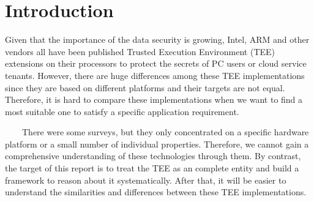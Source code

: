 \documentclass[12pt,twoside]{report}
\date{May 2022}
\begin{document}



\clearpage{\pagestyle{empty}\cleardoublepage}
\setcounter{page}{1}
\pagestyle{fancy}


\cleardoublepage


\tableofcontents 


\clearpage{\pagestyle{empty}\cleardoublepage}
\setcounter{page}{1}
\fancyhead[LE,RO]{\slshape \rightmark}
\fancyhead[LO,RE]{\slshape \leftmark}

\chapter{Introduction}



Given that the importance of the data security is growing, Intel, ARM and other vendors all have been published Trusted Execution Environment (TEE) extensions on their processors to protect the secrets of PC users or cloud service tenants. However, there are huge differences among these TEE implementations since they are based on different platforms and their targets are not equal. Therefore, it is hard to compare these implementations when we want to find a most suitable one to satisfy a specific application requirement.

\ \ \ \ There were some surveys\cite{pinto2019demystifying,maene2017hardware}, but they only concentrated on a specific hardware platform or a small number of  individual properties. Therefore, we cannot gain a comprehensive understanding of these technologies through them. By contrast, the target of this report is to treat the TEE as an complete entity and build a framework to reason about it systematically. After that, it will be easier to understand the similarities and differences between these TEE implementations.
\end{document}
